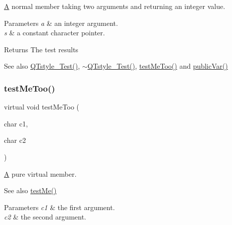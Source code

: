 \hyperlink{class_a}{A} normal member taking two arguments and returning an integer value. 


\begin{DoxyParams}{Parameters}
{\em a} & an integer argument. \\
\hline
{\em s} & a constant character pointer. \\
\hline
\end{DoxyParams}
\begin{DoxyReturn}{Returns}
The test results 
\end{DoxyReturn}
\begin{DoxySeeAlso}{See also}
\hyperlink{class_q_tstyle___test_ac3b85941ca31e9ad22f5bbe68b08a5d8}{Q\+Tstyle\+\_\+\+Test()}, \hyperlink{class_q_tstyle___test_a3a2c6d99c82a00c5e3224aca01f6c7c3}{$\sim$\+Q\+Tstyle\+\_\+\+Test()}, \hyperlink{class_q_tstyle___test_afe4f857536cdccd2f160ad619a61eba3}{test\+Me\+Too()} and \hyperlink{class_q_tstyle___test_a292887ac25652b1d8448430f583378c3}{public\+Var()} 
\end{DoxySeeAlso}
\mbox{\label{class_q_tstyle___test_afe4f857536cdccd2f160ad619a61eba3}} 
\subsubsection{\texorpdfstring{test\+Me\+Too()}{testMeToo()}}
{\footnotesize\ttfamily virtual void test\+Me\+Too (\begin{DoxyParamCaption}\item[{char}]{c1,  }\item[{char}]{c2 }\end{DoxyParamCaption})\hspace{0.3cm}{\ttfamily [pure virtual]}}



\hyperlink{class_a}{A} pure virtual member. 

\begin{DoxySeeAlso}{See also}
\hyperlink{class_q_tstyle___test_af1299ea1b7efeb1548c7aba201ebe756}{test\+Me()} 
\end{DoxySeeAlso}

\begin{DoxyParams}{Parameters}
{\em c1} & the first argument. \\
\hline
{\em c2} & the second argument. \\
\hline
\end{DoxyParams}


